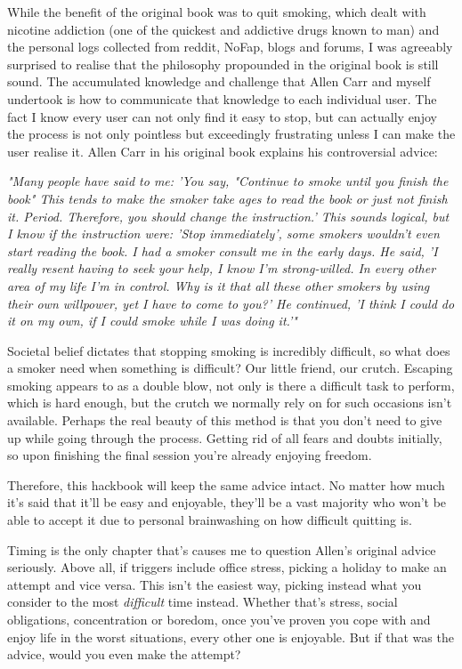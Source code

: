 \documentclass[easypeasy.tex]{subfiles}
\begin{document}
While the benefit of the original book was to quit smoking, which dealt with nicotine addiction (one of the quickest and addictive drugs known to man) and the personal logs collected from reddit, NoFap, blogs and forums, I was agreeably surprised to realise that the philosophy propounded in the original book is still sound. The accumulated knowledge and challenge that Allen Carr and myself undertook is how to communicate that knowledge to each individual user. The fact I know every user can not only find it easy to stop, but can actually enjoy the process is not only pointless but exceedingly frustrating unless I can make the user realise it. Allen Carr in his original book explains his controversial advice:

  \textit{"Many people have said to me: 'You say, "Continue to smoke until you finish the book" This tends to make the smoker take ages to read the book or just not finish it. Period. Therefore, you should change the instruction.' This sounds logical, but I know if the instruction were: 'Stop immediately', some smokers wouldn't even start reading the book. I had a smoker consult me in the early days. He said, 'I really resent having to seek your help, I know I'm strong-willed. In every other area of my life I'm in control. Why is it that all these other smokers by using their own willpower, yet I have to come to you?' He continued, 'I think I could do it on my own, if I could smoke while I was doing it.'"}

Societal belief dictates that stopping smoking is incredibly difficult, so what does a smoker need when something is difficult? Our little friend, our crutch. Escaping smoking appears to as a double blow, not only is there a difficult task to perform, which is hard enough, but the crutch we normally rely on for such occasions isn't available. Perhaps the real beauty of this method is that you don't need to give up while going through the process. Getting rid of all fears and doubts initially, so upon finishing the final session you're already enjoying freedom. 

Therefore, this hackbook will keep the same advice intact. No matter how much it's said that it'll be easy and enjoyable, they'll be a vast majority who won't be able to accept it due to personal brainwashing on how difficult quitting is.

Timing is the only chapter that's causes me to question Allen's original advice seriously. Above all, if triggers include office stress, picking a holiday to make an attempt and vice versa. This isn't the easiest way, picking instead what you consider to the most \textit{difficult} time instead. Whether that's stress, social obligations, concentration or boredom, once you've proven you cope with and enjoy life in the worst situations, every other one is enjoyable. But if that was the advice, would you even make the attempt?
\end{document}
